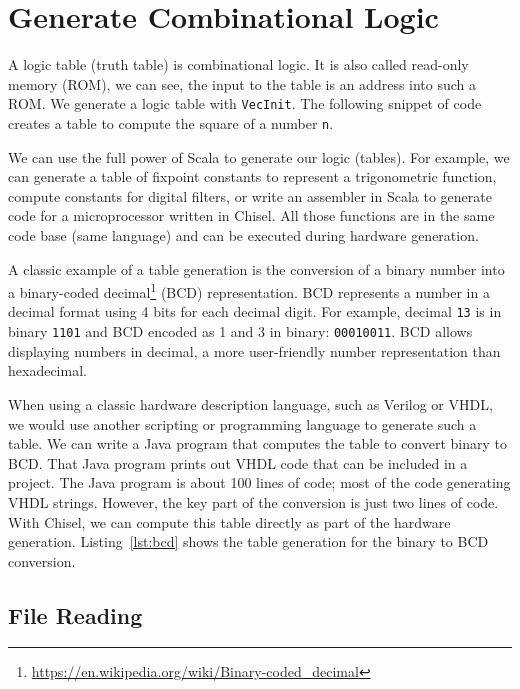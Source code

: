 \documentclass[%
    10pt,
    headinclude, footexclude,
    openright, %
    notitlepage,
    cleardoubleempty,
    headsepline,
    pointlessnumbers,
    bibtotoc, idxtotoc,
    ]{scrbook}
\newcommand{\code}[1]{{\lstinline[basicstyle=\small\ttfamily]{#1}}}
\newcommand{\myref}[2]{\href{#1}{#2}}
\renewcommand{\myref}[2]{{#2}{\footnote{\url{#1}}}}
\begin{document}
\section{Generate Combinational Logic}
\label{sec:gen:comb:logic}

A logic table (truth table) is combinational logic. It is also called read-only memory (ROM),
we can see, the input to the table is an address into such a ROM.
We generate a logic table with \code{VecInit}.  The following snippet of code creates
a table to compute the square of a number \code{n}.


We can use the full power of Scala to generate our logic (tables).
For example, we can generate a table of fixpoint constants to represent a trigonometric function,
compute constants for digital filters, or write an assembler in Scala
to generate code for a microprocessor written in Chisel. All those functions
are in the same code base (same language) and can be executed during
hardware generation.

A classic example of a table generation is the conversion of a binary number
into a \myref{https://en.wikipedia.org/wiki/Binary-coded_decimal}{binary-coded decimal}
(BCD) representation. BCD represents a number in a decimal
format using 4 bits for each decimal digit. For example, decimal \code{13} is in binary
\code{1101} and BCD encoded as 1 and 3 in binary: \code{00010011}.
BCD allows displaying numbers in decimal, a more user-friendly number
representation than hexadecimal.

When using a classic hardware description language, such as Verilog or VHDL,
we would use another scripting or programming language to generate such a table.
We can write a Java program that computes the table to convert binary to BCD.
That Java program prints out VHDL code that can be included in a project.
The Java program is about 100 lines of code; most of the code generating
VHDL strings. However, the key part of the conversion is just two lines of code.
With Chisel, we can compute this table directly as part of the hardware generation.
Listing~\ref{lst:bcd} shows the table generation for the binary to BCD conversion.


\subsection{File Reading}
\end{document}
